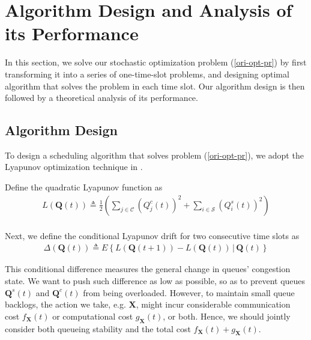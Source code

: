 \documentclass[10pt,journal,compsoc]{IEEEtran}
\begin{document}
	
\section{Algorithm Design and Analysis of its Performance} 

In this section, we solve our stochastic optimization problem (\ref{ori-opt-pr}) by first transforming it into a series of one-time-slot problems, and designing optimal algorithm that solves the problem in each time slot. Our algorithm design is then followed by a theoretical analysis of its performance.

\subsection{Algorithm Design}

To design a scheduling algorithm that solves problem (\ref{ori-opt-pr}), we adopt the Lyapunov optimization technique in \cite{neely2010stochastic}.

Define the quadratic Lyapunov function as
\begin{equation}\label{lyqueue}
	\begin{array}{cl}
		\displaystyle L(\mathbf{Q}(t)) \triangleq \frac{1}{2} \left( \sum_{j \in \mathcal{C}} \left(Q^c_j(t)\right)^2 + \sum_{i \in \mathcal{S}} \left(Q^s_i(t)\right)^2 \right) \\
	\end{array}
\end{equation}

Next, we define the conditional Lyapunov drift for two consecutive time slots as
\begin{equation}\label{cond-drift}
	\begin{array}{c}
		\Delta\left( \mathbf{Q}(t) \right) \triangleq E\left\{ L(\mathbf{Q}(t+1)) - L(\mathbf{Q}(t))\,|\,\mathbf{Q}(t)\right\}
	\end{array}
\end{equation}

This conditional difference measures the general change in queues' congestion state. We want to push such difference as low as possible, so as to prevent queues $\mathbf{Q}^s(t)$ and $\mathbf{Q}^c(t)$ from being overloaded. However, to maintain small queue backlogs, the action we take, e.g. $\mathbf{X}$, might incur considerable communication cost $f_{\mathbf{X}}(t)$ or computational cost $g_{\mathbf{X}}(t)$, or both. Hence, we should jointly consider both queueing stability and the total cost $f_{\mathbf{X}}(t) + g_{\mathbf{X}}(t)$.
\end{document}
